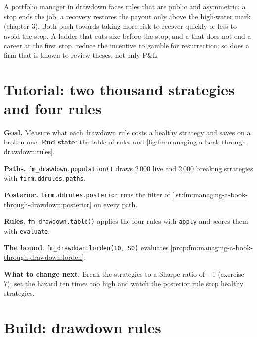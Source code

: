 \begin{remark}\label{rem:fm:managing-a-book-through-drawdown:people}
A portfolio manager in drawdown faces rules that are public and asymmetric: a stop ends the job, a recovery restores the payout only above the
high-water mark (chapter 3). Both push towards taking more risk to recover quickly or less to avoid the stop. A ladder that cuts size before the
stop, and a  that does not end a career at the first stop, reduce the incentive to gamble for resurrection; so does a firm that is
known to review theses, not only P\&L.
\end{remark}

\section{Tutorial: two thousand strategies and four rules}\label{tut:fm:managing-a-book-through-drawdown:tut}

\begin{tutorial}
\textbf{Goal.} Measure what each drawdown rule costs a healthy strategy and saves on a broken one. \textbf{End state:} the table of rules and
\cref{fig:fm:managing-a-book-through-drawdown:rules}.
\begin{tutsteps}
\item \textbf{Paths.} \texttt{fm\_drawdown.population()} draws 2\,000 live and 2\,000 breaking strategies with \texttt{firm.ddrules.paths}.
\item \textbf{Posterior.} \texttt{firm.ddrules.posterior} runs the filter of \cref{lst:fm:managing-a-book-through-drawdown:posterior} on every
path.
\item \textbf{Rules.} \texttt{fm\_drawdown.table()} applies the four rules with \texttt{apply} and scores them with \texttt{evaluate}.
\item \textbf{The bound.} \texttt{fm\_drawdown.lorden(10, S0)} evaluates \cref{prop:fm:managing-a-book-through-drawdown:lorden}.
\end{tutsteps}
\end{tutorial}

\textbf{What to change next.} Break the strategies to a Sharpe ratio of $-1$ (exercise 7); set the hazard ten times too high and watch the
posterior rule stop healthy strategies.

\section{Build: drawdown rules}\label{bld:fm:managing-a-book-through-drawdown:ddrules}

